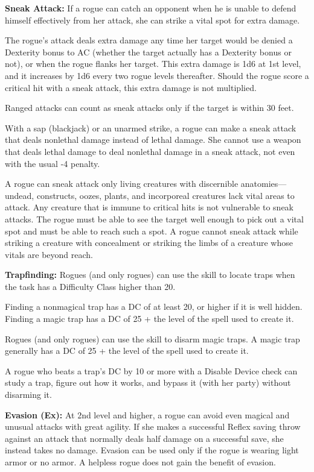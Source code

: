 \textbf{Sneak Attack:} If a rogue can catch an opponent when he is unable to defend 
himself effectively from her attack, she can strike a vital spot for extra damage.

The rogue's attack deals extra damage any time her target would be denied a Dexterity 
bonus to AC (whether the target actually has a Dexterity bonus or not), or when 
the rogue flanks her target. This extra damage is 1d6 at 1st level, and it increases 
by 1d6 every two rogue levels thereafter. Should the rogue score a critical hit 
with a sneak attack, this extra damage is not multiplied.

Ranged attacks can count as sneak attacks only if the target is within 30 feet.

With a sap (blackjack) or an unarmed strike, a rogue can make a sneak attack that 
deals nonlethal damage instead of lethal damage. She cannot use a weapon that deals 
lethal damage to deal nonlethal damage in a sneak attack, not even with the usual 
-4 penalty.

A rogue can sneak attack only living creatures with discernible anatomies---undead, 
constructs, oozes, plants, and incorporeal creatures lack vital areas to attack. 
Any creature that is immune to critical hits is not vulnerable to sneak attacks. 
The rogue must be able to see the target well enough to pick out a vital spot and 
must be able to reach such a spot. A rogue cannot sneak attack while striking a 
creature with concealment or striking the limbs of a creature whose vitals are 
beyond reach.

\textbf{Trapfinding:} Rogues (and only rogues) can use the  skill to locate 
traps when the task has a Difficulty Class higher than 20. 

Finding a nonmagical trap has a DC of at least 20, or higher if it is well hidden. 
Finding a magic trap has a DC of 25 + the level of the spell used to create it.

Rogues (and only rogues) can use the  skill to disarm magic traps. 
A magic trap generally has a DC of 25 + the level of the spell used to create it.

A rogue who beats a trap's DC by 10 or more with a Disable Device check can study 
a trap, figure out how it works, and bypass it (with her party) without disarming 
it.

\textbf{Evasion (Ex):} At 2nd level and higher, a rogue can avoid even magical 
and unusual attacks with great agility. If she makes a successful Reflex saving 
throw against an attack that normally deals half damage on a successful save, she 
instead takes no damage. Evasion can be used only if the rogue is wearing light 
armor or no armor. A helpless rogue does not gain the benefit of evasion.

